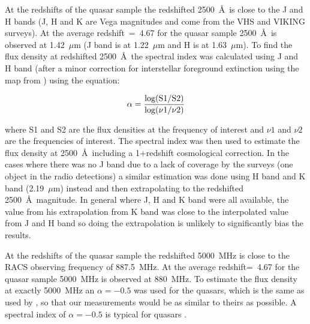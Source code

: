 \documentclass[a4paper,fleqn,usenatbib]{mnras}
\begin{document}
At the redshifts of the quasar sample the redshifted 2500~\AA\ is close to the J and H bands (J, H and K are Vega magnitudes {and come from the VHS and VIKING surveys)}.  At the average redshift~=~4.67 for the quasar sample 2500~\AA\ is observed at 1.42~$\mu$m (J band is at 1.22~$\mu$m and H is at 1.63~$\mu$m).  To find the flux density at redshifted 2500~\AA\ the spectral index was calculated using J and H band {(after a minor correction for interstellar foreground extinction using the map from \citet{schlegel98})} using the  equation:

\begin{equation}
\rm \alpha = \frac{ \log(S1/S2)} { \log(\nu 1/\nu 2) }
\end{equation}

where S1 and S2 are the flux densities at the frequency of interest and $\nu 1$ and $\nu 2$ are the frequencies of interest.  The spectral index was then used to estimate the flux density at 2500~\AA\ including a 1+redshift cosmological correction.  In the cases where there was no J band {due to a lack of coverage by the surveys} (one object in the radio detections) a similar estimation was done using H band and K band (2.19~$\mu$m) instead and then extrapolating to the redshifted 2500~\AA\ magnitude.  In general where J, H and K band were all available, the value from his extrapolation from K band was close to the interpolated value from J and H band so doing the extrapolation is unlikely to significantly bias the results.  

At the redshifts of the quasar sample the redshifted 5000~MHz is close to the RACS observing frequency of 887.5~MHz.  At the average redshift=~4.67 for the quasar sample 5000~MHz is observed at 880~MHz.  To estimate the flux density at exactly 5000~MHz an $\alpha = -0.5$ was used for the quasars, which is the same as used by \citet{jiang07}, {so that our measurements would be as similar to theirs as possible. A spectral index of $\alpha = -0.5$ is typical for quasars  \citep[e.g.][]{ivezic04b}.}  

\end{document}
